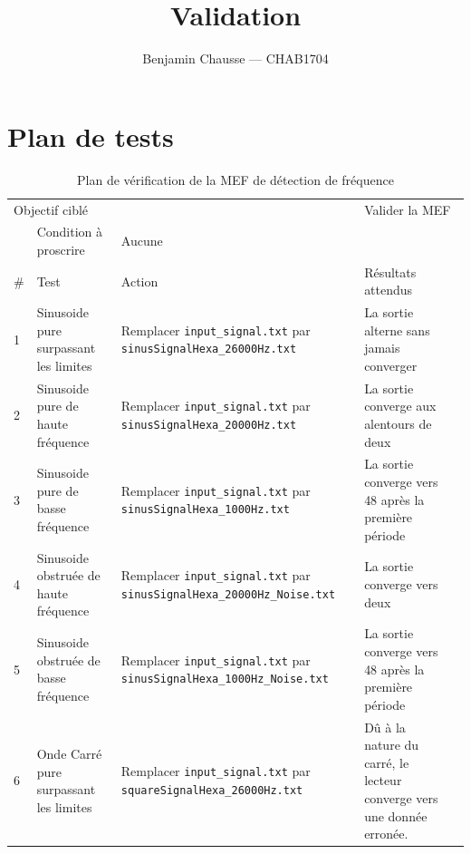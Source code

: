 \documentclass[a11paper]{article}
\title{Validation}
\author{Benjamin Chausse --- CHAB1704}
\newcommand{\cbox}[1][\relax]{\bgroup\setlength{\fboxsep}{4pt}\setlength{\fboxrule}{0.5pt}\fbox{}\egroup}
\begin{document}
\maketitle

\section{Plan de tests}

\begin{table}[H]
  \centering
  \footnotesize
  \caption{Plan de vérification de la MEF de détection de fréquence}
  \begin{tabular}{llp{4.7cm}p{3cm}l}
    \toprule
    \multicolumn{3}{l}{Objectif ciblé} & \multicolumn{2}{l}{Valider la MEF}  \\
    & Condition à proscrire & Aucune &  \\
    \midrule
    \# & Test & Action & Résultats attendus & \\
    \midrule

    1 & Sinusoide pure surpassant les limites &
      Remplacer \Verb#input_signal.txt# par \Verb#sinusSignalHexa_26000Hz.txt# &
      La sortie alterne sans jamais converger & \cbox[name = hf_sin_over]{ } \\

    2 & Sinusoide pure de haute fréquence &
      Remplacer \Verb#input_signal.txt# par \Verb#sinusSignalHexa_20000Hz.txt# &
      La sortie converge aux alentours de deux\footnotemark[1] & \cbox[name = hf_sin_pure]{ } \\

    3 & Sinusoide pure de basse fréquence &
		  Remplacer \Verb#input_signal.txt# par \Verb#sinusSignalHexa_1000Hz.txt# &
      La sortie converge vers 48 après la première période\footnotemark[2] & \cbox[name = lf_sin_pure]{ } \\

    4 & Sinusoide obstruée de haute fréquence &
      Remplacer \Verb#input_signal.txt# par \Verb#sinusSignalHexa_20000Hz_Noise.txt# &
      La sortie converge vers deux\footnotemark[3] & \cbox[name = hf_sin_noise]{ } \\

    5 & Sinusoide obstruée de basse fréquence &
		  Remplacer \Verb#input_signal.txt# par \Verb#sinusSignalHexa_1000Hz_Noise.txt# &
      La sortie converge vers 48 après la première période\footnotemark[2]  & \cbox[name = lf_sin_noise]{ } \\

    6 & Onde Carré pure surpassant les limites &
      Remplacer \Verb#input_signal.txt# par \Verb#squareSignalHexa_26000Hz.txt# &
      Dû à la nature du carré, le lecteur converge vers une donnée erronée. & \cbox[name = hf_square_over]{ } \\


\end{tabular}
\end{table}
\end{document}
